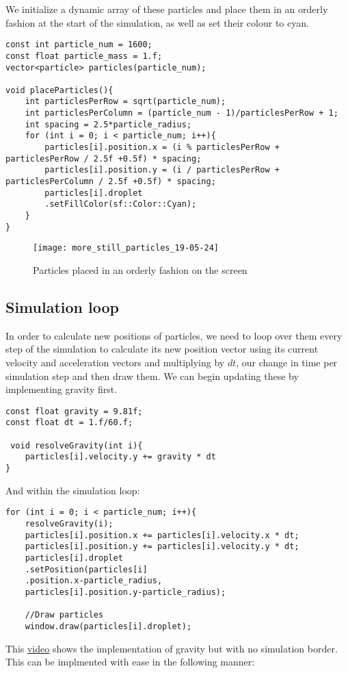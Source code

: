 \documentclass[write-up.tex]{subfiles}
\begin{document}
We initialize a dynamic array of these particles and place them in an orderly fashion at the start of the simulation, as well as set their colour to cyan.

\begin{lstlisting}
const int particle_num = 1600;
const float particle_mass = 1.f;
vector<particle> particles(particle_num);

void placeParticles(){
    int particlesPerRow = sqrt(particle_num);
    int particlesPerColumn = (particle_num - 1)/particlesPerRow + 1;
    int spacing = 2.5*particle_radius;
    for (int i = 0; i < particle_num; i++){
        particles[i].position.x = (i % particlesPerRow + particlesPerRow / 2.5f +0.5f) * spacing;
        particles[i].position.y = (i / particlesPerRow + particlesPerColumn / 2.5f +0.5f) * spacing;
        particles[i].droplet
        .setFillColor(sf::Color::Cyan);
    }
}

\end{lstlisting}

\begin{figure}
\centering
\texttt{[image: more\_still\_particles\_19-05-24]}
\caption{Particles placed in an orderly fashion on the screen}
\end{figure}

\subsection{Simulation loop}
In order to calculate new positions of particles, we need to loop over them every step of the simulation to calculate its new position vector using its current velocity and acceleration vectors and multiplying by $dt$, our change in time per simulation step and then draw them. We can begin updating these by implementing gravity first.
\begin{lstlisting}
const float gravity = 9.81f;
const float dt = 1.f/60.f;

 void resolveGravity(int i){
    particles[i].velocity.y += gravity * dt
}
\end{lstlisting}

And within the simulation loop:
\begin{lstlisting}
for (int i = 0; i < particle_num; i++){
    resolveGravity(i);
    particles[i].position.x += particles[i].velocity.x * dt;
    particles[i].position.y += particles[i].velocity.y * dt;
    particles[i].droplet
    .setPosition(particles[i]
    .position.x-particle_radius,
    particles[i].position.y-particle_radius);

    //Draw particles
    window.draw(particles[i].droplet);
\end{lstlisting}
This \href{https://youtube.com/shorts/FSuH_Cs1Qh4?feature=share}{video} shows the implementation of gravity but with no simulation border. This can be implmented with ease in the following manner:
\end{document}
